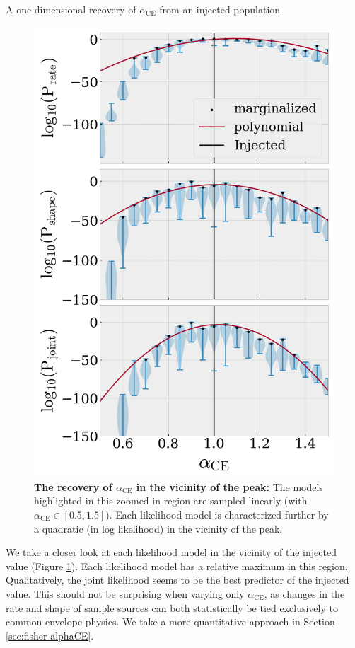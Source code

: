 \documentclass[twocolumn]{aastex631}
\newcommand*{\alphaCE}{\alpha_{\mathrm{CE}}}
\begin{document}
\begin{subsection}{A one-dimensional recovery of $\alphaCE$ from an injected population}
\begin{figure}
\includegraphics[width=3.375 in]{CEb60_m12i-000_inj_likelihood.png}
\caption{\label{fig:true_binfrac_lnL}
    \textbf{The recovery of $\alphaCE$ in the vicinity of the peak:}
The models highlighted in this zoomed in region
    are sampled linearly (with $\alphaCE \in [0.5,1.5]$).
Each likelihood model is characterized further by a quadratic
    (in log likelihood)
    in the vicinity of the peak.
}
\end{figure}

We take a closer look at each likelihood model in the vicinity 
    of the injected value (Figure \ref{fig:true_binfrac_lnL}).
Each likelihood model has a relative maximum in this region.
Qualitatively, the joint likelihood seems to be the
    best predictor of the injected value.
This should not be surprising when varying only $\alphaCE$,
    as changes in the rate and shape of sample sources
    can both statistically be tied exclusively to common envelope physics.
We take a more quantitative approach in Section \ref{sec:fisher-alphaCE}.

\end{subsection}
\end{document}

